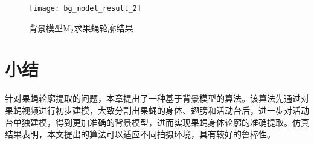 \begin{figure}[thb]
\centering
\texttt{[image: bg\_model\_result\_2]}
\caption{背景模型$\textrm{M}_2$求果蝇轮廓结果}
\label{fig:bg_model_result_2}
\end{figure}

\section{小结}
针对果蝇轮廓提取的问题，本章提出了一种基于背景模型的算法。该算法先通过对果蝇视频进行初步建模，大致分割出果蝇的身体、翅膀和活动台后，进一步对活动台单独建模，得到更加准确的背景模型，进而实现果蝇身体轮廓的准确提取。仿真结果表明，本文提出的算法可以适应不同拍摄环境，具有较好的鲁棒性。

